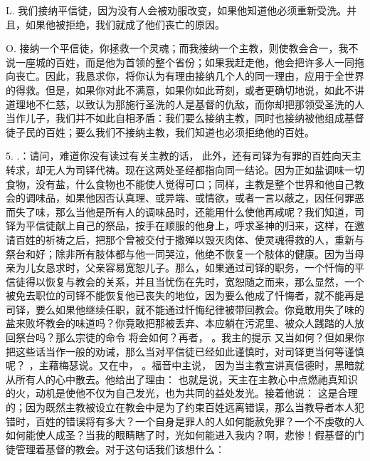 L. 我们接纳平信徒，因为没有人会被劝服改变，如果他知道他必须重新受洗。并且，如果他被拒绝，我们就成了他们丧亡的原因。\par

O. 接纳一个平信徒，你拯救一个灵魂；而我接纳一个主教，则使教会合一，我不说一座城的百姓，而是他为首领的整个省份；如果我赶走他，他会把许多人一同拖向丧亡。因此，我恳求你，将你认为有理由接纳几个人的同一理由，应用于全世界的得救。但是，如果你对此不满意，如果你如此苛刻，或者更确切地说，如此不讲道理地不仁慈，以致认为那施行圣洗的人是基督的仇敌，而你却把那领受圣洗的人当作儿子，我们并不如此自相矛盾：我们要么接纳主教，同时也接纳被他组成基督徒子民的百姓；要么我们不接纳主教，我们知道也必须拒绝他的百姓。\par

5. .：请问，难道你没有读过有关主教的话， 此外，还有司铎为有罪的百姓向天主转求，却无人为司铎代祷。现在这两处圣经都指向同一结论。因为正如盐调味一切食物，没有盐，什么食物也不能使人觉得可口；同样，主教是整个世界和他自己教会的调味品，如果他因否认真理、或异端、或情欲，或者一言以蔽之，因任何罪恶而失了味，那么当他是所有人的调味品时，还能用什么使他再咸呢？我们知道，司铎为平信徒献上自己的祭品，按手在顺服的他身上，呼求圣神的归来，这样，在邀请百姓的祈祷之后，把那个曾被交付于撒殚以毁灭肉体、使灵魂得救的人，重新与祭台和好；除非所有肢体都与他一同哭泣，他绝不恢复一个肢体的健康。因为当母亲为儿女恳求时，父亲容易宽恕儿子。那么，如果通过司铎的职务，一个忏悔的平信徒得以恢复与教会的关系，并且当忧伤在先时，宽恕随之而来，那么显然，一个被免去职位的司铎不能恢复他已丧失的地位，因为要么他成了忏悔者，就不能再是司铎，要么如果他继续任职，就不能通过忏悔纪律被带回教会。你竟敢用失了味的盐来败坏教会的味道吗？你竟敢把那被丢弃、本应躺在污泥里、被众人践踏的人放回祭台吗？那么宗徒的命令 将会如何？再者， 。我主的提示 又当如何？但如果你把这些话当作一般的劝诫，那么当对平信徒已经如此谨慎时，对司铎更当何等谨慎呢？ ，主藉梅瑟说。又在中， 。福音中主说， 因为当主教宣讲真信德时，黑暗就从所有人的心中散去。他给出了理由： 也就是说，天主在主教心中点燃祂真知识的火，动机是使他不仅为自己发光，也为共同的益处发光。接着他说： 这是合理的；因为既然主教被设立在教会中是为了约束百姓远离错误，那么当教导者本人犯错时，百姓的错误将有多大？一个自身是罪人的人如何能赦免罪？一个不虔敬的人如何能使人成圣？当我的眼睛瞎了时，光如何能进入我内？啊，悲惨！假基督的门徒管理着基督的教会。对于这句话我们该想什么： 